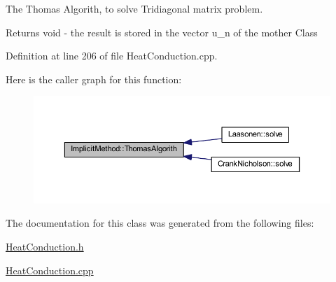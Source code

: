 The Thomas Algorith, to solve Tridiagonal matrix problem. 

\begin{DoxyReturn}{Returns}
void -\/ the result is stored in the vector u\+\_\+n of the mother Class 
\end{DoxyReturn}


Definition at line 206 of file Heat\+Conduction.\+cpp.

Here is the caller graph for this function\+:\nopagebreak
\begin{figure}[H]
\begin{center}
\leavevmode
\includegraphics[width=350pt]{class_implicit_method_ae06f9aa9d076738cdcb7cd967d453795_icgraph}
\end{center}
\end{figure}


The documentation for this class was generated from the following files\+:\begin{DoxyCompactItemize}
\item 
\hyperlink{_heat_conduction_8h}{Heat\+Conduction.\+h}\item 
\hyperlink{_heat_conduction_8cpp}{Heat\+Conduction.\+cpp}\end{DoxyCompactItemize}
